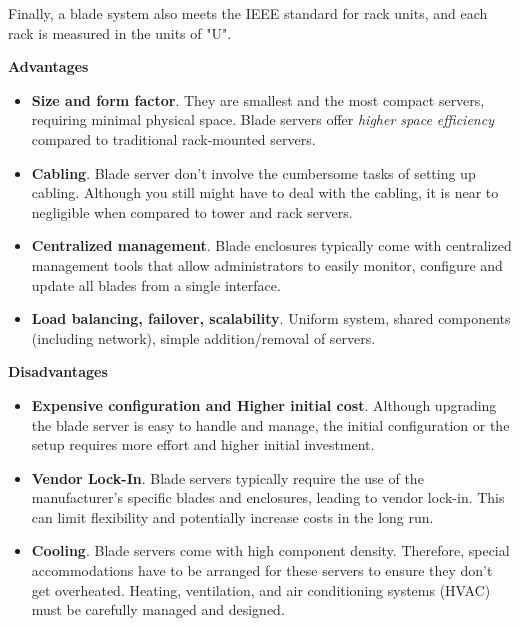\highspace
Finally, a blade system also meets the IEEE standard for rack units, and each rack is measured in the units of "U".

\begin{flushleft}
    \textcolor{Green3}{ \textbf{Advantages}}
\end{flushleft}
\begin{itemize}[label=]
    \item \textbf{Size and form factor}. They are smallest and the most compact servers, requiring minimal physical space. Blade servers offer \emph{higher space efficiency} compared to traditional rack-mounted servers.

    \item \textbf{Cabling}. Blade server don't involve the cumbersome tasks of setting up cabling. Although you still might have to deal with the cabling, it is near to negligible when compared to tower and rack servers.

    \item \textbf{Centralized management}. Blade enclosures typically come with centralized management tools that allow administrators to easily monitor, configure and update all blades from a single interface.

    \item \textbf{Load balancing, failover, scalability}. Uniform system, shared components (including network), simple addition/removal of servers.
\end{itemize}

\begin{flushleft}
    \textcolor{Red2}{ \textbf{Disadvantages}}
\end{flushleft}
\begin{itemize}[label=]
    \item \textbf{Expensive configuration and Higher initial cost}. Although upgrading the blade server is easy to handle and manage, the initial configuration or the setup requires more effort and higher initial investment.

    \item \textbf{Vendor Lock-In}. Blade servers typically require the use of the manufacturer's specific blades and enclosures, leading to vendor lock-in. This can limit flexibility and potentially increase costs in the long run.

    \item \textbf{Cooling}. Blade servers come with high component density. Therefore, special accommodations have to be arranged for these servers to ensure they don't get overheated. Heating, ventilation, and air conditioning systems (HVAC) must be carefully managed and designed.
\end{itemize}

